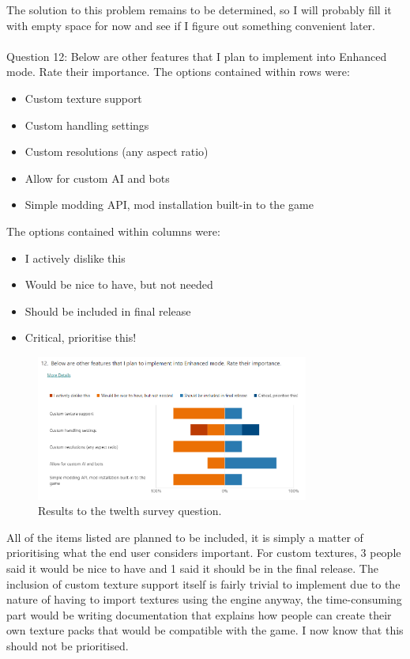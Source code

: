\documentclass{report}
\begin{document}
The solution to this problem remains to be determined, so I will probably fill it with empty space for now and see if I figure out something convenient later.
\\\\
Question 12: Below are other features that I plan to implement into Enhanced mode. Rate their importance.
The options contained within rows were:
\begin{itemize}
    \renewcommand\labelitemi{--}
    \item Custom texture support
    \item Custom handling settings
    \item Custom resolutions (any aspect ratio)
    \item Allow for custom AI and bots
    \item Simple modding API, mod installation built-in to the game
\end{itemize}
The options contained within columns were:
\begin{itemize}
    \renewcommand\labelitemi{--}
    \item I actively dislike this
    \item Would be nice to have, but not needed
    \item Should be included in final release
    \item Critical, prioritise this!
\end{itemize}

\begin{figure}[ht]
    \centering
    \includegraphics[width=0.8\textwidth]{survey12.png}
    \caption{\label{fig:survey12}Results to the twelth survey question.}
\end{figure}

All of the items listed are planned to be included, it is simply a matter of prioritising what the end user considers important.
For custom textures, 3 people said it would be nice to have and 1 said it should be in the final release. The inclusion of custom texture support itself is fairly trivial to implement due to the nature of having to import textures using the engine anyway, the time-consuming part would be writing documentation that explains how people can create their own texture packs that would be compatible with the game. I now know that this should not be prioritised.
\end{document}
